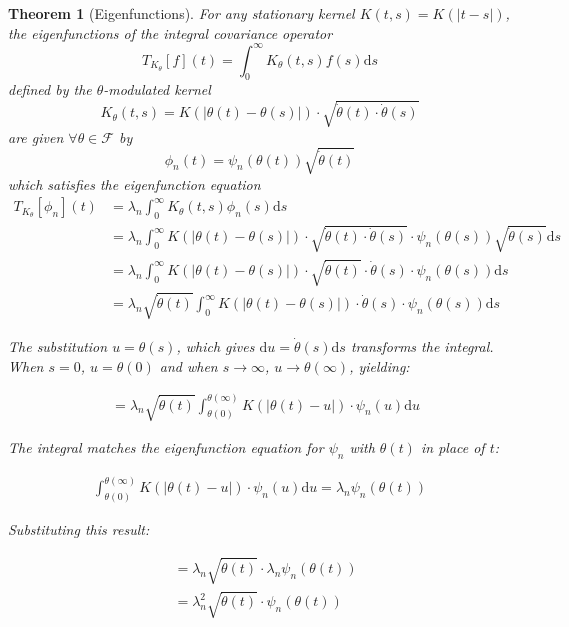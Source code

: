 \documentclass{article}
\newtheorem{theorem}{Theorem}
\newcommand{\dd}{\mathrm{d}}
\newcommand{\Fcal}{\mathcal{F}}
\newcommand{\dottheta}{\dot{\theta}}
\begin{document}
\begin{theorem}[Eigenfunctions]
For any stationary kernel $K(t,s)=K(|t-s|)$, the eigenfunctions of the integral covariance operator
\begin{equation}
T_{K_\theta}[f](t) = \int_0^\infty K_\theta(t,s)f(s)\dd s
\end{equation}
defined by the $\theta$-modulated kernel
\begin{equation}
K_\theta(t,s) = K(|\theta(t)-\theta(s)|) \cdot \sqrt{\dottheta(t) \cdot \dottheta(s)}
\end{equation}
are given $\forall \theta\in\Fcal$ by
\begin{equation}
\phi_n(t) = \psi_n(\theta(t))\sqrt{\dottheta(t)}
\end{equation}
which satisfies the eigenfunction equation
\begin{align}
T_{K_\theta}[\phi_n](t) &= \lambda_n \int_0^\infty K_\theta(t,s) \phi_n(s) \dd s\\
&= \lambda_n \int_0^\infty K(|\theta(t)-\theta(s)|) \cdot \sqrt{\dottheta(t) \cdot \dottheta(s)} \cdot \psi_n(\theta(s))\sqrt{\dottheta(s)} \dd s\\
&= \lambda_n \int_0^\infty K(|\theta(t)-\theta(s)|) \cdot \sqrt{\dottheta(t)} \cdot \dottheta(s) \cdot \psi_n(\theta(s)) \dd s\\
&= \lambda_n \sqrt{\dottheta(t)} \int_0^\infty K(|\theta(t)-\theta(s)|) \cdot \dottheta(s) \cdot \psi_n(\theta(s)) \dd s
\end{align}

The substitution $u = \theta(s)$, which gives $\dd u = \dottheta(s) \dd s$ transforms the integral. 
When $s = 0$, $u = \theta(0)$ and when $s \to \infty$, $u \to \theta(\infty)$, yielding:

\begin{align}
&= \lambda_n \sqrt{\dottheta(t)} \int_{\theta(0)}^{\theta(\infty)} K(|\theta(t)-u|) \cdot \psi_n(u) \dd u
\end{align}

The integral matches the eigenfunction equation for $\psi_n$ with $\theta(t)$ in place of $t$:

\begin{align}
\int_{\theta(0)}^{\theta(\infty)} K(|\theta(t)-u|) \cdot \psi_n(u) \dd u = \lambda_n \psi_n(\theta(t))
\end{align}

Substituting this result:

\begin{align}
&= \lambda_n \sqrt{\dottheta(t)} \cdot \lambda_n \psi_n(\theta(t))\\
&= \lambda_n^2 \sqrt{\dottheta(t)} \cdot \psi_n(\theta(t))
\end{align}


\end{theorem}
\end{document}
